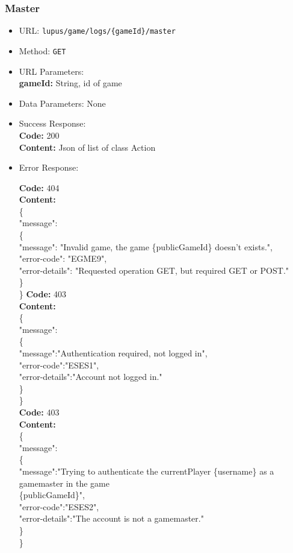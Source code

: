 \subsubsection*{Master}
\begin{itemize}
    \item URL: \texttt{lupus/game/logs/\{gameId\}/master}
    \item Method: \texttt{GET}
    \item URL Parameters:\\
        \textbf{gameId:} String, id of game
    \item Data Parameters: None
    \item Success Response: \\
        \textbf{Code:} 200\\
        \textbf{Content:} Json of list of class Action
    \item Error Response:
   
        \textbf{Code:} 404\\
        \textbf{Content:}\\
        \{\\
         \tab "message": \\
         \tab \{\\
         \tab \tab "message": "Invalid game, the game \{publicGameId\} doesn't exists.",\\
         \tab \tab "error-code": "EGME9",\\
         \tab \tab "error-details": "Requested operation GET, but required GET or POST."\\
         \tab \}\\
        \}
        \textbf{Code:} 403\\
        \textbf{Content:}\\
        \{      \\ 
         \tab "message":\\
         \tab \{\\
         \tab \tab  "message":"Authentication required, not logged in",\\
         \tab \tab  "error-code":"ESES1",\\
         \tab \tab  "error-details":"Account not logged in."\\
         \tab \}\\
        \}\\
        \textbf{Code:} 403\\
        \textbf{Content:}\\
        \{\\
         \tab "message":\\
         \tab \{\\
         \tab \tab "message":"Trying to authenticate the currentPlayer \{username\} as a   gamemaster in the game \\
         \tab \tab\{publicGameId\}",\\
         \tab \tab "error-code":"ESES2",\\
         \tab \tab "error-details":"The account is not a gamemaster."\\
         \tab \}\\
        \}\\
\end{itemize}
